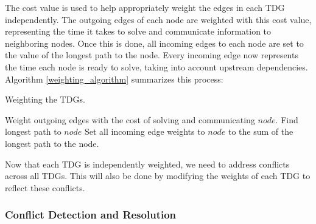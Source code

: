 \documentclass[11pt, letterpaper,titlepage,oneside]{article}
\begin{document}
The cost value is used to help appropriately weight the edges in each TDG independently. The outgoing edges of each node are weighted with this cost value, representing the time it takes to solve and communicate information to neighboring nodes. Once this is done, all incoming edges to each node are set to the value of the longest path to the node. Every incoming edge now represents the time each node is ready to solve, taking into account upstream dependencies. Algorithm \ref{weighting_algorithm} summarizes this process:

\begin{algorithm}[H]
\caption{Weighting the TDGs.}
\label{weighting_algorithm}
\begin{algorithmic}
\STATE Weight outgoing edges with the cost of solving and communicating $node$.
\ENDFOR
{}
\STATE Find longest path to $node$
\STATE Set all incoming edge weights to $node$ to the sum of the longest path to the node.
\ENDFOR
\label{universalweights}
\end{algorithmic}
\end{algorithm}

Now that each TDG is independently weighted, we need to address conflicts across all TDGs. This will also be done by modifying the weights of each TDG to reflect these conflicts.

\subsubsection{Conflict Detection and Resolution}
\end{document}
